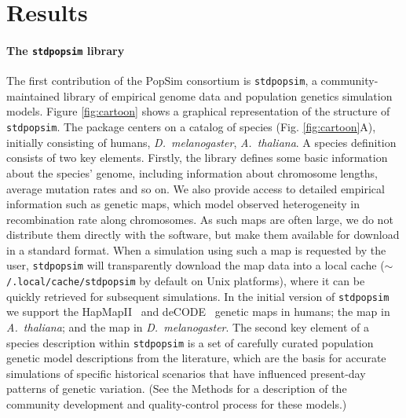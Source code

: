 \documentclass[12pt,halfline,a4paper]{ouparticle}
\newcommand{\stdpopsim}{\texttt{stdpopsim}\xspace}
\begin{document}
\section*{Results}
\paragraph{The \stdpopsim library}
The first contribution of the PopSim consortium is \stdpopsim, a
community-maintained library of empirical genome data and population genetics simulation
models. Figure \ref{fig:cartoon} shows a graphical
representation of the structure of \stdpopsim. The package centers
on a catalog of species (Fig. \ref{fig:cartoon}A), initially consisting of humans,
\emph{D.~melanogaster}, \emph{A.~thaliana}.
A species definition consists of two key elements.  Firstly, the library defines
some basic information about the species' genome, including information about chromosome
lengths, average mutation rates and so on. We also provide access to detailed
empirical information such as genetic maps, which model observed
heterogeneity in recombination rate along chromosomes. As such maps are often large,
we do not distribute them directly with the software, but make them available
for download in a standard format. When a simulation using such a map is
requested by the user, \stdpopsim will transparently download the map
data into a local cache (\texttt{$\sim$/.local/cache/stdpopsim} by default
on Unix platforms), where it can be quickly retrieved for subsequent
simulations.
In the initial version of \stdpopsim we support
the HapMapII~\citep{international2007second} and
deCODE~\citep{kong2010fine} genetic maps in humans;
the \cite{salome2011recombination} map in \emph{A.~thaliana};
and the \cite{comeron2012many} map in \emph{D.~melanogaster}.
The second key element of a species description
within \stdpopsim is a set of carefully curated population genetic model
descriptions from the literature, which are the basis for accurate simulations
of specific historical scenarios that have influenced present-day patterns of
genetic variation. (See the Methods for a description of the community
development and quality-control process for these models.)
\end{document}
